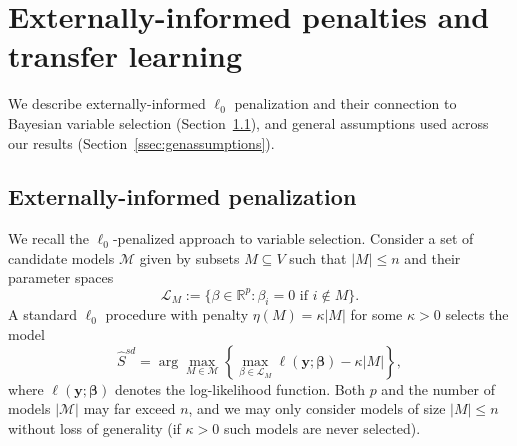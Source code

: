\documentclass[
  12pt]{article}
\newcommand{\R}{\mathbb{R}}
\newcommand{\M}{\mathcal{M}}
\newcommand{\by}{\mathbf{y}}
\newcommand{\bbeta}{\boldsymbol{\beta}}
\begin{document}
\section{Externally-informed penalties and transfer learning}\label{sec:intro_blockpen} 

We describe externally-informed $\ell_0$ penalization and their connection to Bayesian variable selection (Section~\ref{ssec:intro_blockpen}), and general assumptions used across our results (Section~\ref{ssec:genassumptions}).

\subsection{Externally-informed penalization}\label{ssec:intro_blockpen}

We recall the $\ell_0$-penalized approach to variable selection. Consider a set of candidate models $\M$ given by subsets $M\subseteq V$ such that $|M|\leq n$ and their parameter spaces
\[
\mathcal{L}_M := \{\beta\in \R^p: \beta_i=0 \text{ if } i\notin M\}.
\]
A standard $\ell_0$ procedure with penalty $\eta(M)=\kappa |M|$ for some $\kappa>0$ selects the model
\begin{equation}\label{eq:stdl0}
\hat{S}^{sd}= \arg\max_{M\in \M} \left\{\max_{\beta\in \mathcal{L}_M}\ell(\by; \bbeta)-\kappa |M|\right\},
\end{equation}
where $\ell(\by; \bbeta)$ denotes the log-likelihood function. 
Both $p$ and the number of models $|\mathcal{M}|$ may far exceed $n$, and we may only consider models of size $|M| \leq n$ without loss of generality (if $\kappa>0$ such models are never selected).
\end{document}
